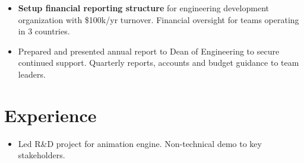 \documentclass[margin]{res}
\begin{document}
\begin{sloppypar}
\begin{resume}
    \begin{itemize}
        \item \textbf{Setup financial reporting structure} for engineering development organization with \$100k/yr turnover. Financial oversight for teams operating in 3 countries.
        \item Prepared and presented annual report to Dean of Engineering to secure continued support. Quarterly reports, accounts and budget guidance to team leaders.
    \end{itemize}

\section{Experience}
\begin{itemize}
    \item Led R\&D project for animation engine. Non-technical demo to key stakeholders.
\end{itemize}


\end{resume}
\end{sloppypar}
\end{document}
